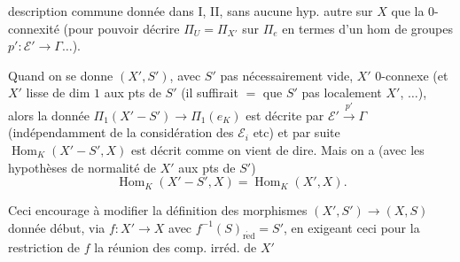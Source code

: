 description commune donnée dans I, II, sans aucune hyp. autre sur $X$ que  la $0$-connexité (pour pouvoir décrire $\Pi_U=\Pi_{X'}$ sur $\Pi_e$ en termes d'un hom de groupes $p':\mathcal E'\longrightarrow\Gamma\ldots$).

Quand on se donne $(X',S')$, avec $S'$ pas nécessairement vide, $X'$ $0$-connexe (et  $X'$ lisse de dim $1$ aux pts de $S'$ (il suffirait $=$ que $S'$   pas localement  $X'$, $\ldots$),
alors la  donnée
$\Pi_1(X'-S')\longrightarrow\Pi_1(e_K)$ est décrite  par $\mathcal E'\xrightarrow{p'}\Gamma$ (indépendamment de la considération des $\mathcal E_i$ etc) et par suite $\operatorname{Hom}_K(X'-S',X)$ est décrit comme on vient de dire.
Mais on a (avec les hypothèses de normalité de $X'$ aux pts de $S'$)
\[
\operatorname{Hom}_K(X'-S',X)=\operatorname{Hom}_K(X',X).
\]

Ceci encourage à modifier la définition des morphismes $(X',S')\longrightarrow(X,S)$ donnée  début, via $f:X'\longrightarrow X$ avec $f^{-1}(S)_{\mathrm{r\acute ed}}=S'$, en exigeant ceci   pour la restriction de $f$  la réunion des comp. irréd. de $X'$
